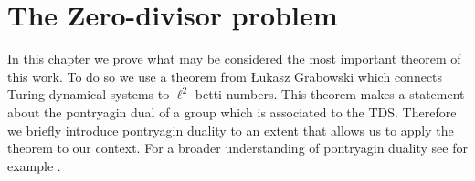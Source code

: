 \section{The Zero-divisor problem}

In this chapter we prove what may be considered the most important theorem of this work.
To do so we use a theorem from \L{}ukasz Grabowski which connects Turing dynamical systems to $\ell^2$-betti-numbers.
This theorem makes a statement about the pontryagin dual of a group which is associated to the TDS.
Therefore we briefly introduce pontryagin duality to an extent that allows us to apply the theorem to our context.
For a broader understanding of pontryagin duality see for example \cite{fol95}.




